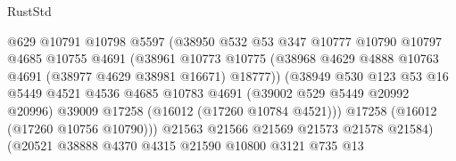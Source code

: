 \begin{lexlean}{RustStd}
\begin{coremodule}
                                    @629
                                    @10791
                                    @10798
                                    @5597
                                    (@38950
                                      @532
                                      @53
                                      @347
                                      @10777
                                      @10790
                                      @10797
                                      @4685
                                      @10755
                                      @4691
                                      (@38961
                                        @10773
                                        @10775
                                        (@38968
                                          @4629
                                          @4888
                                          @10763
                                          @4691
                                          (@38977 @4629 @38981 @16671)
                                          @18777))
                                      (@38949
                                        @530
                                        @123
                                        @53
                                        @16
                                        @5449
                                        @4521
                                        @4536
                                        @4685
                                        @10783
                                        @4691
                                        (@39002 @529 @5449 @20992 @20996)
                                        @39009
                                        @17258
                                        (@16012 (@17260 @10784 @4521)))
                                      @17258
                                      (@16012 (@17260 @10756 @10790)))
                                    @21563
                                    @21566
                                    @21569
                                    @21573
                                    @21578
                                    @21584)
                                  (@20521
                                    @38888
                                    @4370
                                    @4315
                                    @21590
                                    @10800
                                    @3121
                                    @735
                                    @13

\end{coremodule}
\end{lexlean}
